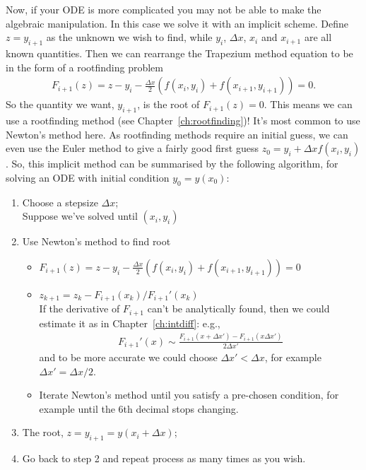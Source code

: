 Now, if your ODE is more complicated you may not be able to make the algebraic manipulation. In this case we solve it with an implicit scheme. Define $z=y_{i+1}$ as the unknown we wish to find, while $y_i$, $\Delta x$, $x_i$ and $x_{i+1}$ are all known quantities. Then we can rearrange the Trapezium method equation to be in the form of a rootfinding problem
\begin{align*}
F_{i+1}(z) = z - y_i - \frac{\Delta x}{2} \left(f(x_i,y_i) + f(x_{i+1},y_{i+1}) \right) = 0.
\end{align*}
So the quantity we want, $y_{i+1}$, is the root of $F_{i+1}(z)=0$. This means we can use a rootfinding method (see Chapter~\ref{ch:rootfinding})! It's most common to use Newton's method here. As rootfinding methods require an initial guess, we can even use the Euler method to give a fairly good first guess $z_0 = y_i + \Delta x f(x_i,y_i)$. So, this implicit method can be summarised by the following algorithm, for solving an ODE with initial condition $y_0 = y(x_0)$:
\begin{enumerate}
	\item Choose a stepsize $\Delta x$; \\
	Suppose we've solved until $(x_i, y_i)$
	\item Use Newton's method to find root
	\begin{itemize}
		\item $F_{i+1}(z) = z - y_i - \frac{\Delta x}{2} \left(f(x_i,y_i) + f(x_{i+1},y_{i+1}) \right) = 0$
		\item $z_{k+1} = z_k - F_{i+1}(x_k)/F_{i+1}'(x_k)$ \\
		If the derivative of $F_{i+1}$ can't be analytically found, then we could estimate it as in Chapter~\ref{ch:intdiff}: e.g.,
		\begin{align*}
		F_{i+1}'(x) \sim \frac{F_{i+1}(x+\Delta x') - F_{i+1}(x\Delta x')}{2\Delta x'}
		\end{align*}
		and to be more accurate we could choose $\Delta x' < \Delta x$, for example $\Delta x' = \Delta x / 2$.
		\item Iterate Newton's method until you satisfy a pre-chosen condition, for example until the 6th decimal stops changing.
	\end{itemize}
	\item The root, $z=y_{i+1} = y(x_i + \Delta x)$;
	\item Go back to step 2 and repeat process as many times as you wish.
\end{enumerate}


